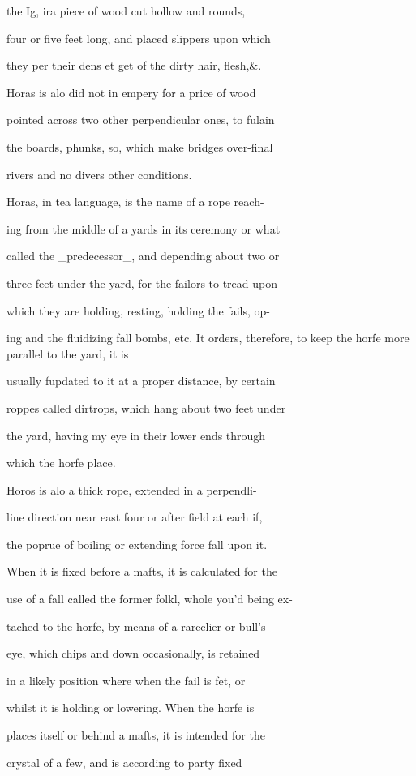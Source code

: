 \documentclass{article}
\begin{document}
the Ig, ira piece of wood cut hollow and rounds,

four or five feet long, and placed slippers upon which

they per their dens et get of the dirty hair, flesh,\&.

Horas is alo did not in empery for a price of wood

pointed across two other perpendicular ones, to fulain

the boards, phunks, so, which make bridges over-final

rivers and no divers other conditions.

Horas, in tea language, is the name of a rope reach-

ing from the middle of a yards in its ceremony or what

called the \_predecessor\_, and depending about two or

three feet under the yard, for the failors to tread upon

which they are holding, resting, holding the fails, op-

ing and the fluidizing fall bombs, etc. It orders, therefore, to keep the horfe more parallel to the yard, it is

usually fupdated to it at a proper distance, by certain

roppes called dirtrops, which hang about two feet under

the yard, having my eye in their lower ends through

which the horfe place.

Horos is alo a thick rope, extended in a perpendli-

line direction near east four or after field at each if,

the poprue of boiling or extending force fall upon it.

When it is fixed before a mafts, it is calculated for the

use of a fall called the former folkl, whole you'd being ex-

tached to the horfe, by means of a rareclier or bull's

eye, which chips and down occasionally, is retained

in a likely position where when the fail is fet, or

whilst it is holding or lowering. When the horfe is

places itself or behind a mafts, it is intended for the

crystal of a few, and is according to party fixed
\end{document}
